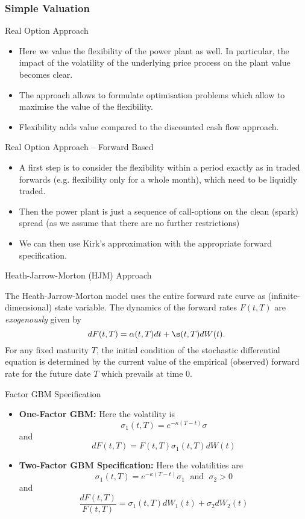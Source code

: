 \subsubsection{Simple Valuation}

{Real Option Approach}
\begin{itemize}
\item<1-> Here we value the flexibility of the power plant as well. In particular, the impact of the volatility of the underlying price process on the plant value becomes clear.
\item<2-> The approach allows to formulate optimisation problems which allow to maximise the value of the flexibility.
\item<3-> Flexibility adds value compared to the discounted cash flow approach.
\end{itemize}

{Real Option Approach -- Forward Based}
\begin{itemize}
\item<1-> A first step is to consider the flexibility within a period exactly as in traded forwards (e.g. flexibility only for a whole month), which need to be liquidly traded.
\item<2-> Then the power plant is just a sequence of call-options on the clean (spark) spread
(as we assume that there are no further restrictions)
\item<3-> We can then use Kirk's approximation with the appropriate forward specification.
\end{itemize}

{Heath-Jarrow-Morton (HJM) Approach}

The Heath-Jarrow-Morton model uses the entire forward rate curve as
(infinite-dimensional) state variable. The dynamics of the forward rates $F(t,T)$ are {\it exogenously} given by
$$
dF(t,T) = \alpha(t,T) dt + \s(t,T) dW(t).
$$
For any fixed maturity $T$, the
initial condition of the stochastic differential equation
is determined by the current value
of the empirical (observed) forward rate for the future date $T$
which prevails at time $0$.

{Factor GBM Specification}
\begin{itemize}
\item<1-> {\bf One-Factor GBM:} Here the volatility is
$$
\sigma_1(t,T)=e^{-\kappa (T-t)}\sigma
$$
and
$$
dF(t,T)=F(t,T)\sigma_1(t,T)dW(t)
$$
\item<2->{\bf Two-Factor GBM Specification:}
Here the volatilities are
$$
\sigma_1(t,T)=e^{-\kappa (T-t)}\sigma_1 \; \mbox{ and } \; \sigma_2>0
$$
and
$$
\frac{dF(t,T)}{F(t,T)}=\sigma_1(t,T)dW_1(t)+\sigma_2dW_2(t)
$$
\end{itemize}

